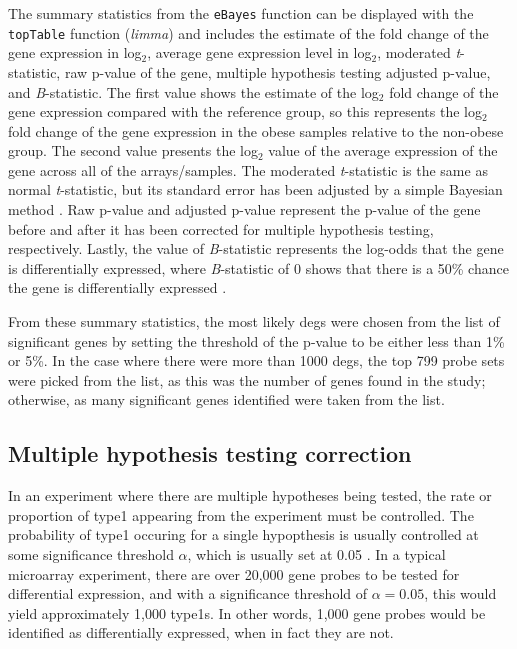 The summary statistics from the \texttt{eBayes} function can be displayed with the \texttt{topTable} function (\textit{limma}) and includes the estimate of the fold change of the gene expression in log$_2$, average gene expression level in log$_2$, moderated \textit{t}-statistic, raw p-value of the gene, multiple hypothesis testing adjusted p-value, and \textit{B}-statistic.
The first value shows the estimate of the log$_2$ fold change of the gene expression compared with the reference group, so this represents the log$_2$ fold change of the gene expression in the obese samples relative to the non-obese group.
The second value presents the log$_2$ value of the average expression of the gene across all of the arrays/samples.
The moderated \textit{t}-statistic is the same as normal \textit{t}-statistic, but its standard error has been adjusted by a simple Bayesian method \citep{Smyth2005}.
Raw p-value and adjusted p-value represent the p-value of the gene before and after it has been corrected for multiple hypothesis testing, respectively.
Lastly, the value of \textit{B}-statistic represents the log-odds that the gene is differentially expressed, where \textit{B}-statistic of 0 shows that there is a 50\% chance the gene is differentially expressed \citep{Smyth2005}.

From these summary statistics, the most likely \glspl{deg} were chosen from the list of significant genes by setting the threshold of the p-value to be either less than 1\% or 5\%.
In the case where there were more than 1000 \glspl{deg}, the top 799 probe sets were picked from the list, as this was the number of genes found in the \citet{Creighton2012} study; otherwise, as many significant genes identified were taken from the list.

\subsection{Multiple hypothesis testing correction}
\label{sub:multiple_hypothesis_testing_correction}

In an experiment where there are multiple hypotheses being tested, the rate or proportion of \gls{type1} appearing from the experiment must be controlled.
The probability of \gls{type1} occuring for a single hypopthesis is usually controlled at some significance threshold $\alpha$, which is usually set at 0.05 \citep{Shaffer1995}.
In a typical microarray experiment, there are over 20,000 gene probes to be tested for differential expression, and with a significance threshold of $\alpha = 0.05$, this would yield approximately 1,000 \glspl{type1}.
In other words, 1,000 gene probes would be identified as differentially expressed, when in fact they are not.

